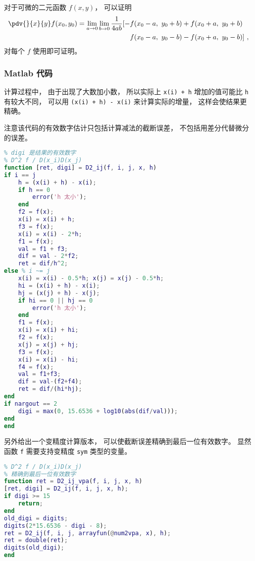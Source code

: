
\begin{issues}
\issueDraft
\end{issues}


对于可微的二元函数 $f(x,y)$， 可以证明
\begin{equation}
\begin{aligned}
\pdv{}{x}{y} f(x_0,y_0) = \lim_{a\to 0}\lim_{b\to 0}\frac{1}{4ab}[-& f(x_0-a,\ y_0+b) + f(x_0+a,\  y_0+b)\\
& f(x_0-a,\  y_0-b) - f(x_0+a,\  y_0-b)]~,
\end{aligned}
\end{equation}
对每个 $f$ 使用即可证明。

\subsubsection{Matlab 代码}

计算过程中， 由于出现了大数加小数， 所以实际上 \verb`x(i) + h` 增加的值可能比 \verb`h` 有较大不同， 可以用 \verb`(x(i) + h) - x(i)` 来计算实际的增量， 这样会使结果更精确。

注意该代码的有效数字估计只包括计算减法的截断误差， 不包括用差分代替微分的误差。
\begin{lstlisting}[language=matlab, caption=D2\_ij.m]
% 数值二阶偏导
% digi 是结果的有效数字
% D^2 f / D(x_i)D(x_j)
function [ret, digi] = D2_ij(f, i, j, x, h)
if i == j
    h = (x(i) + h) - x(i);
    if h == 0
        error('h 太小');
    end
    f2 = f(x);
    x(i) = x(i) + h;
    f3 = f(x);
    x(i) = x(i) - 2*h;
    f1 = f(x);
    val = f1 + f3;
    dif = val - 2*f2;
    ret = dif/h^2;
else % i ~= j
    x(i) = x(i) - 0.5*h; x(j) = x(j) - 0.5*h;
    hi = (x(i) + h) - x(i);
    hj = (x(j) + h) - x(j);
    if hi == 0 || hj == 0
        error('h 太小');
    end
    f1 = f(x);
    x(i) = x(i) + hi;
    f2 = f(x);
    x(j) = x(j) + hj;
    f3 = f(x);
    x(i) = x(i) - hi;
    f4 = f(x);
    val = f1+f3;
    dif = val-(f2+f4);
    ret = dif/(hi*hj);
end
if nargout == 2
    digi = max(0, 15.6536 + log10(abs(dif/val)));
end
end
\end{lstlisting}

另外给出一个变精度计算版本， 可以使截断误差精确到最后一位有效数字。 显然函数 \verb`f` 需要支持变精度 \verb`sym` 类型的变量。
\begin{lstlisting}[language=matlab, caption=D2\_ij\_vpa.m]
% 数值二阶偏导 (变精度)
% D^2 f / D(x_i)D(x_j)
% 精确到最后一位有效数字
function ret = D2_ij_vpa(f, i, j, x, h)
[ret, digi] = D2_ij(f, i, j, x, h);
if digi >= 15
    return;
end
old_digi = digits;
digits(2*15.6536 - digi - 8);
ret = D2_ij(f, i, j, arrayfun(@num2vpa, x), h);
ret = double(ret);
digits(old_digi);
end
\end{lstlisting}
